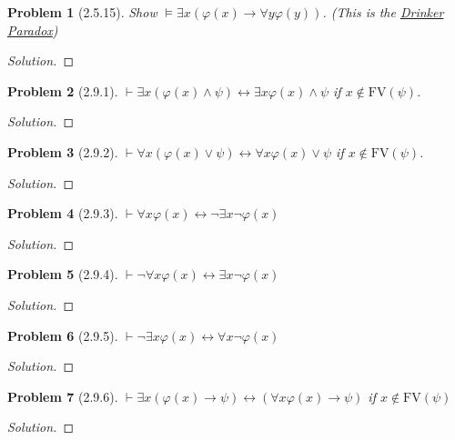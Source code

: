 \documentclass[letter]{article}
\newtheorem{problem}{Problem}
\theoremstyle{definition}
\newenvironment{solution}
{\begin{proof}[Solution]}
        {\end{proof}}
\renewcommand{\phi}{\varphi}
\begin{document}
\begin{problem}[2.5.15]
    Show $\models \exists x (\phi(x) \to \forall y \phi(y))$. (This is the \href{https://en.wikipedia.org/wiki/Drinker_paradox}{Drinker Paradox})
\end{problem}
\begin{solution}
\end{solution}

\begin{problem}[2.9.1]
    $\vdash \exists x (\phi(x) \land \psi) \leftrightarrow \exists x \phi(x) \land \psi$ if $x \notin \textrm{FV}(\psi)$.
\end{problem}
\begin{solution}
\end{solution}

\begin{problem}[2.9.2]
    $\vdash \forall x (\phi(x) \lor \psi) \leftrightarrow \forall x \phi(x) \lor \psi$ if $x \notin \textrm{FV}(\psi)$.
\end{problem}
\begin{solution}
\end{solution}

\begin{problem}[2.9.3]
    $\vdash \forall x \phi(x) \leftrightarrow \neg \exists x \neg \phi(x)$
\end{problem}
\begin{solution}
\end{solution}

\begin{problem}[2.9.4]
    $\vdash \neg \forall x \phi(x) \leftrightarrow \exists x \neg \phi(x)$
\end{problem}
\begin{solution}
\end{solution}

\begin{problem}[2.9.5]
    $\vdash \neg \exists x \phi(x) \leftrightarrow \forall x \neg \phi(x)$
\end{problem}
\begin{solution}
\end{solution}

\begin{problem}[2.9.6]
    $\vdash \exists x (\phi(x) \to \psi) \leftrightarrow (\forall x \phi(x) \to \psi)$ if $x \notin \textrm{FV}(\psi)$
\end{problem}
\begin{solution}
\end{solution}
\end{document}
